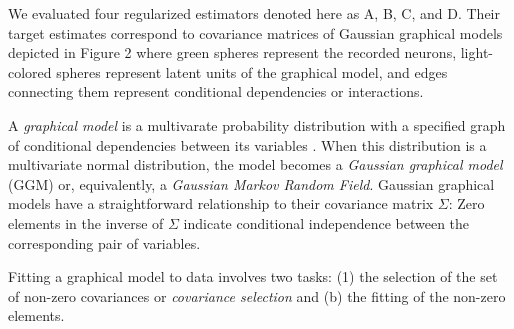 We evaluated four regularized estimators denoted here as A, B, C, and D.  Their target estimates correspond to covariance matrices of Gaussian graphical models depicted in Figure 2 where green spheres represent the recorded neurons,  light-colored spheres represent latent units of the graphical model, and edges connecting them represent conditional dependencies or interactions.



A \emph{graphical model} is a multivarate probability distribution with a specified graph of conditional dependencies between its variables \cite{Koller:2009}.  When this distribution is a multivariate normal distribution, the model becomes a \emph{Gaussian graphical model} (GGM) or, equivalently, a \emph{Gaussian Markov Random Field}.  Gaussian graphical models have a straightforward relationship to their covariance matrix $\Sigma$:  Zero elements in the inverse of $\Sigma$ indicate conditional independence between the corresponding pair of variables.  


Fitting a graphical model to data involves two tasks: (1) the selection of the set of non-zero covariances or \emph{covariance selection} \cite{Dempster:1972} and (b) the fitting of the non-zero elements.

